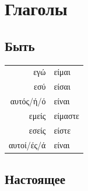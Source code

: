\documentclass[12pt]{article}
\newenvironment{page}{\clearpage\normalsize\null\vfill}{\vfill\null}
\begin{document}
	\begin{page}
        \section{Глаголы}
        \subsection*{Быть}
		\begin{tabular}{rl}
			εγώ & είμαι \\
			εσύ & είσαι\\
			αυτός/ή/ό & είναι\\
			εμείς & είμαστε\\
			εσείς & είστε\\
			αυτοί/ές/ά & είναι\\
		\end{tabular}

		\vfill

        \subsection{Настоящее}



\end{page}
\end{document}
